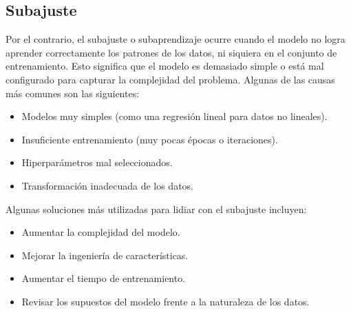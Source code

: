 \documentclass[12pt]{article}
\begin{document}
\subsection{Subajuste}
    Por el contrario, el subajuste o subaprendizaje ocurre cuando el modelo no logra aprender correctamente los patrones de los datos, ni siquiera en el conjunto de entrenamiento.
    Esto significa que el modelo es demasiado simple o está mal configurado para capturar la complejidad del problema. Algunas de las causas más comunes son las siguientes: 
    \begin{itemize}
        \item Modelos muy simples (como una regresión lineal para datos no lineales).
        \item Insuficiente entrenamiento (muy pocas épocas o iteraciones).
        \item Hiperparámetros mal seleccionados.
        \item Transformación inadecuada de los datos.
    \end{itemize}

    Algunas soluciones más utilizadas para lidiar con el subajuste incluyen:
    \begin{itemize}
        \item Aumentar la complejidad del modelo.
        \item Mejorar la ingeniería de características.
        \item Aumentar el tiempo de entrenamiento.
        \item Revisar los supuestos del modelo frente a la naturaleza de los datos.
    \end{itemize}
\cite{De0a100enIA}

\end{document}
